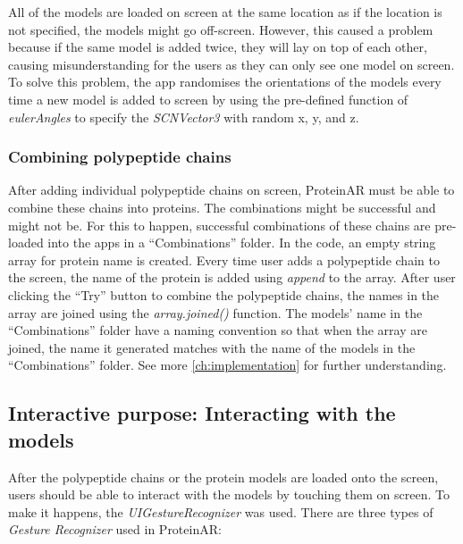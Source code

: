 All of the models are loaded on screen at the same location as if the location is not specified, the models might go off-screen. However, this caused a problem because if the same model is added twice, they will lay on top of each other, causing misunderstanding for the users as they can only see one model on screen. To solve this problem, the app randomises the orientations of the models every time a new model is added to screen by using the pre-defined function of \emph{eulerAngles} to specify the \emph{SCNVector3} with random x, y, and z.

\subsubsection{Combining polypeptide chains}
After adding individual polypeptide chains on screen, ProteinAR must be able to combine these chains into proteins. The combinations might be successful and might not be. For this to happen, successful combinations of these chains are pre-loaded into the apps in a “Combinations” folder. 
In the code, an empty string array for protein name is created. Every time user adds a polypeptide chain to the screen, the name of the protein is added using \emph{append} to the array. After user clicking the “Try” button to combine the polypeptide chains, the names in the array are joined using the \emph{array.joined()} function. The models’ name in the “Combinations” folder have a naming convention so that when the array are joined, the name it generated matches with the name of the models in the “Combinations” folder. See more \autoref{ch:implementation} for further understanding. 

\subsection{Interactive purpose: Interacting with the models}
After the polypeptide chains or the protein models are loaded onto the screen, users should be able to interact with the models by touching them on screen. To make it happens, the \emph{UIGestureRecognizer} was used. There are three types of \emph{Gesture Recognizer} used in ProteinAR:


